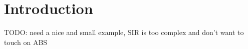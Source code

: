 \section{Introduction}
TODO: need a nice and small example, SIR is too complex and don't want to touch on ABS

